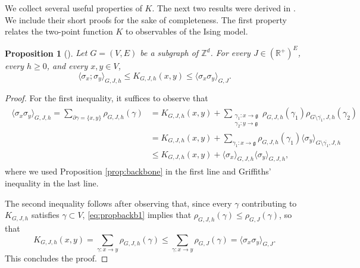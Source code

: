 \documentclass[11pt,a4paper]{article}
\numberwithin{equation}{section}
\theoremstyle{plain}
\newtheorem{Prop}[Thm]{Proposition}
\theoremstyle{definition}
\begin{document}
We collect several useful properties of $K$. The next two results were derived in \cite{AizenmanFernandezCriticalBehaviorMagnetization1986}. We include their short proofs for the sake of completeness. The first property relates the two-point function $K$ to observables of the Ising model.
\begin{Prop}[{\hspace{1pt}\cite[Proposition~4.7]{AizenmanFernandezCriticalBehaviorMagnetization1986}}]\label{prop:trunc vs K vs untrunc} Let $G=(V,E)$ be a subgraph of $\mathbb Z^d$. For every $J\in (\mathbb R^+)^E$, every $h\geq 0$, and every $x,y\in V$,\begin{equation}
	\langle \sigma_x;\sigma_y\rangle_{G,J,h}\leq K_{G,J,h}(x,y)\leq \langle \sigma_x\sigma_y\rangle_{G,J}.
\end{equation}
\end{Prop}
\begin{proof} For the first inequality, it suffices to observe that
\begin{align}
\begin{aligned}
	\langle \sigma_x\sigma_y\rangle_{G,J,h}=\sum_{\partial\gamma=\{x,y\}}\rho_{G,J,h}(\gamma)&=K_{G,J,h}(x,y)+\sum_{\substack{\gamma_1:x\rightarrow \mathfrak{g}\\\gamma_2:y\rightarrow \mathfrak{g}}}\rho_{G,J,h}(\gamma_1)\rho_{G\setminus\overline{\gamma_1},J,h}(\gamma_2)
	\\&=K_{G,J,h}(x,y)+\sum_{\gamma_1:x\rightarrow\mathfrak{g}}\rho_{G,J,h}(\gamma_1)\langle \sigma_y\rangle_{G\setminus\overline{\gamma_1},J,h}
	\\&\leq K_{G,J,h}(x,y)+\langle \sigma_x\rangle_{G,J,h}\langle \sigma_y\rangle_{G,J,h},
	\end{aligned}
\end{align}
where we used Proposition \ref{prop:backbone} in the first line and Griffiths' inequality in the last line. 

 The second inequality follows after observing that, since every $\gamma$ contributing to $K_{G,J,h}$ satisfies $\gamma\subset V$, \eqref{eq:propbackb1} implies that
	$\rho_{G,J,h}(\gamma)\leq \rho_{G,J}(\gamma)$, so that
	\begin{equation}
		K_{G,J,h}(x,y)=\sum_{\gamma:x\rightarrow y}\rho_{G,J,h}(\gamma)\leq \sum_{\gamma: x\rightarrow y}\rho_{G,J}(\gamma)=\langle \sigma_x\sigma_y\rangle_{G,J}.
	\end{equation}
This concludes the proof.
\end{proof}
\end{document}
